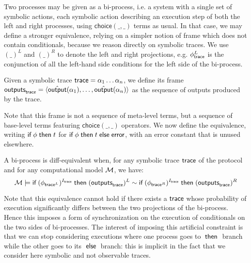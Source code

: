 \newcommand{\diff}[2]{\mathsf{choice}(#1,#2)}

Two processes may be given as a bi-process, i.e. a system with a single
set of symbolic actions, each symbolic action describing an execution step
of both the left and right processes, using $\diff{\_}{\_}$
terms as usual. In that case, we may define a stronger equivalence,
relying on a simpler notion of frame which does not contain conditionals,
because we reason directly on symbolic traces.
We use $(\_)^L$ and $(\_)^R$ to denote the left and right projections,
e.g. $\phi_{\textsf{trace}}^L$ is the conjunction of all the left-hand side
conditions for the left side of the bi-process.

\begin{definition}
  Given a symbolic trace $\textsf{trace} = \alpha_1\ldots\alpha_n$, we define its frame 
  $\textsf{outputs}_{\textsf{trace}} = \langle \hat{\textsf{output}}(\alpha_1),\dots,\hat{\textsf{output}}(\alpha_n) \rangle$
  as the sequence of outputs produced by the trace.
\end{definition}

Note that this frame is not a sequence of meta-level terms,
but a sequence of base-level terms featuring
$\diff{\_}{\_}$ operators.
We now define the equivalence,
writing $\textsf{if}\; \phi \;\textsf{then}\; t$ for $\textsf{if}\; \phi \;\textsf{then}\; t \;\textsf{else}\; 
\mathsf{error}$, with an error constant that is unused elsewhere.

\begin{definition}
  A bi-process is diff-equivalent when,
  for any symbolic trace $\textsf{trace}$ of the protocol and
  for any computational model $\mathcal{M}$,
  we have:
  $$\mathcal{M} \models
  \textsf{if}\; (\phi_{\textsf{trace}^L})^{I_{\textsf{trace}}} \;\textsf{then}\; (\textsf{outputs}_{\textsf{trace}})^L
  \sim   
  \textsf{if}\; (\phi_{\textsf{trace}^R})^{I_{\textsf{trace}}} \;\textsf{then}\; (\textsf{outputs}_{\textsf{trace}})^R$$
\end{definition}

Note that this equivalence cannot hold if there exists a $\textsf{trace}$
whose probability of execution significantly differs between the two
projections of the bi-process.
Hence this imposes a form of synchronization on the execution of
conditionals on the two sides of bi-processes.
The interest of imposing this artificial constraint is that we
can stop considering executions where one process goes to $\;\textsf{then}\;$
branch while the other goes to its $\;\textsf{else}\;$ branch: this is implicit
in the fact that we consider here symbolic and not observable traces.

\newcommand{\In}{\mathsf{in}}
\newcommand{\Out}{\mathsf{out}}

